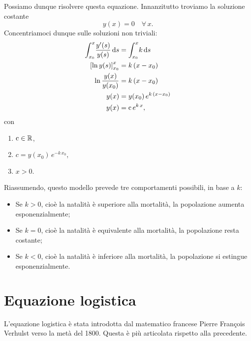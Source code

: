 \documentclass[../../analisi2]{subfiles}
\begin{document}
            Possiamo dunque risolvere questa equazione. Innanzitutto troviamo la soluzione costante
            \[
                y(x) = 0 \quad \forall \, x.
            \]
            Concentriamoci dunque sulle soluzioni non triviali:
            \begin{align*}
                \int_{x_0}^{x} \! \frac{y'(s)}{y(s)} \, \mathrm{d}s &= \int_{x_0}^{x} \! k \, \mathrm{d}s\\
                \left[\ln{y(s)}\right]_{x_0}^x &= k \, (x - x_0)\\
                \ln{\frac{y(x)}{y(x_0)}} &= k \, (x - x_0)\\
                y(x) &= y(x_0) \, e^{k \, (x - x_0)}\\
                y(x) &= \mathrm{c} \, e^{k \, x},
            \end{align*}
            \newpage
            con
            \begin{enumerate}
                \item \(\mathrm{c} \in \mathbb{R}\),
                \item \(c = y(x_0) \, e^{-k \, x_0}\),
                \item \(x > 0\).
            \end{enumerate}

            Riassumendo, questo modello prevede tre comportamenti possibili, in base a \(k\):
            \begin{itemize}
                \item Se \(k > 0\), cioè la natalità è superiore alla mortalità, la popolazione aumenta esponenzialmente;
                \item Se \(k = 0\), cioè la natalità è equivalente alla mortalità, la popolazione resta costante;
                \item Se \(k < 0\), cioè la natalità è inferiore alla mortalità, la popolazione si estingue esponenzialmente.
            \end{itemize}

        \section{Equazione logistica}

            L'equazione logistica è stata introdotta dal matematico francese Pierre François Verhulst verso la metà del 1800. Questa è più
            articolata rispetto alla precedente.
\end{document}
